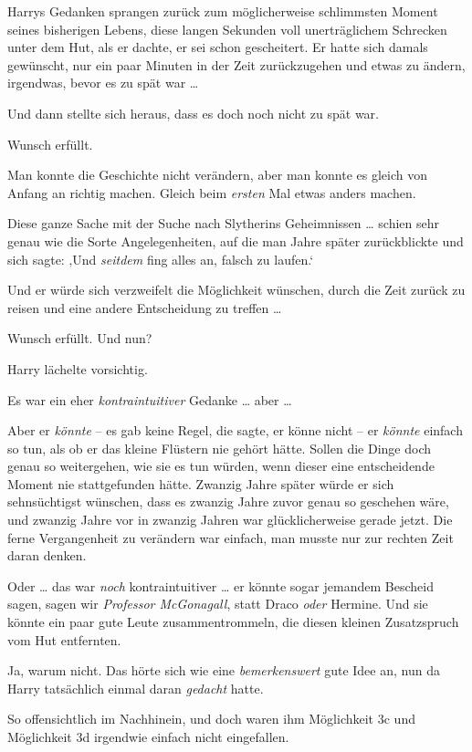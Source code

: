 {Harrys Gedanken sprangen zurück zum möglicherweise schlimmsten Moment seines bisherigen Lebens, diese langen Sekunden voll unerträglichem Schrecken unter dem Hut, als er dachte, er sei schon gescheitert. Er hatte sich damals gewünscht, nur ein paar Minuten in der Zeit zurückzugehen und etwas zu ändern, irgendwas, bevor es zu spät war …

Und dann stellte sich heraus, dass es doch noch nicht zu spät war.

Wunsch erfüllt.

Man konnte die Geschichte nicht verändern, aber man konnte es gleich von Anfang an richtig machen. Gleich beim \emph{ersten} Mal etwas anders machen.

Diese ganze Sache mit der Suche nach Slytherins Geheimnissen … schien sehr genau wie die Sorte Angelegenheiten, auf die man Jahre später zurückblickte und sich sagte: ‚Und \emph{seitdem} fing alles an, falsch zu laufen.`

Und er würde sich verzweifelt die Möglichkeit wünschen, durch die Zeit zurück zu reisen und eine andere Entscheidung zu treffen …

Wunsch erfüllt. Und nun?

Harry lächelte vorsichtig.

Es war ein eher \emph{kontraintuitiver} Gedanke … aber …

Aber er \emph{könnte} -- es gab keine Regel, die sagte, er könne nicht -- er \emph{könnte} einfach so tun, als ob er das kleine Flüstern nie gehört hätte. Sollen die Dinge doch genau so weitergehen, wie sie es tun würden, wenn dieser eine entscheidende Moment nie stattgefunden hätte. Zwanzig Jahre später würde er sich sehnsüchtigst wünschen, dass es zwanzig Jahre zuvor genau so geschehen wäre, und zwanzig Jahre vor in zwanzig Jahren war glücklicherweise gerade jetzt. Die ferne Vergangenheit zu verändern war einfach, man musste nur zur rechten Zeit daran denken.

Oder … das war \emph{noch} kontraintuitiver … er könnte sogar jemandem Bescheid sagen, sagen wir \emph{Professor McGonagall}, statt Draco \emph{oder} Hermine. Und sie könnte ein paar gute Leute zusammentrommeln, die diesen kleinen Zusatzspruch vom Hut entfernten.

Ja, warum nicht. Das hörte sich wie eine \emph{bemerkenswert} gute Idee an, nun da Harry tatsächlich einmal daran \emph{gedacht} hatte.

So offensichtlich im Nachhinein, und doch waren ihm Möglichkeit 3c und Möglichkeit 3d irgendwie einfach nicht eingefallen.

}
